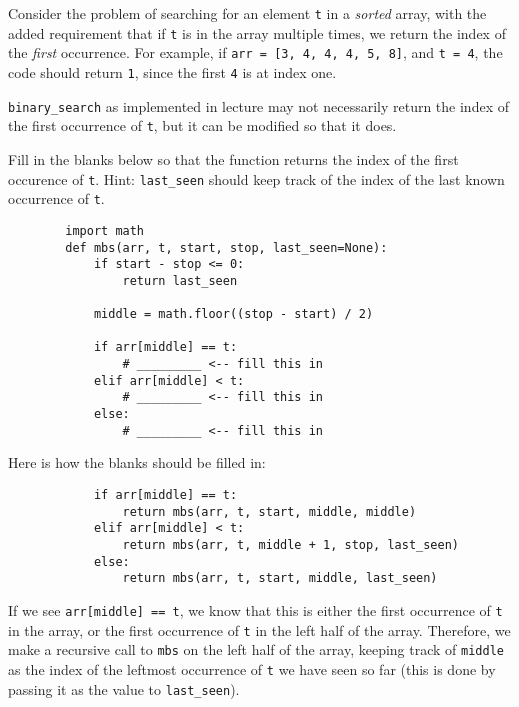 \begin{prob}
    Consider the problem of searching for an element \texttt{t} in a
    \textit{sorted} array, with the added requirement that if \texttt{t} is in
    the array multiple times, we return the index of the \textit{first} occurrence.
    For example, if \texttt{arr = [3, 4, 4, 4, 5, 8]}, and \texttt{t = 4}, the code
    should return \texttt{1}, since the first \texttt{4} is at index one.

    \texttt{binary_search} as implemented in lecture may not necessarily return
    the index of the first occurrence of \texttt{t}, but it can be modified
    so that it does.

    Fill in the blanks below so that the function returns the index of the
    first occurence of \texttt{t}. Hint: \texttt{last_seen} should keep track of the
    index of the last known occurrence of \texttt{t}.

    \begin{verbatim}
        import math
        def mbs(arr, t, start, stop, last_seen=None):
            if start - stop <= 0:
                return last_seen

            middle = math.floor((stop - start) / 2)

            if arr[middle] == t:
                # _________ <-- fill this in
            elif arr[middle] < t:
                # _________ <-- fill this in
            else:
                # _________ <-- fill this in
    \end{verbatim}

    \begin{soln}

        Here is how the blanks should be filled in:

        \begin{verbatim}
            if arr[middle] == t:
                return mbs(arr, t, start, middle, middle)
            elif arr[middle] < t:
                return mbs(arr, t, middle + 1, stop, last_seen)
            else:
                return mbs(arr, t, start, middle, last_seen)
        \end{verbatim}

        If we see \texttt{arr[middle] == t}, we know that this is either
        the first occurrence of \texttt{t} in the array, or the 
        first occurrence of \texttt{t} in the left half of the array.
        Therefore, we make a recursive call to \texttt{mbs} on the left
        half of the array, keeping track of \texttt{middle} as the index
        of the leftmost occurrence of \texttt{t} we have seen so far (this is
        done by passing it as the value to \texttt{last_seen}).


\end{soln}
\end{prob}
